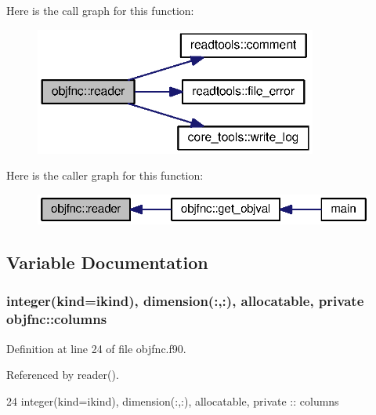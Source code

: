 Here is the call graph for this function\+:\nopagebreak
\begin{figure}[H]
\begin{center}
\leavevmode
\includegraphics[width=263pt]{namespaceobjfnc_ac0a20b2f9874813942bd7dc35e3b4842_cgraph}
\end{center}
\end{figure}




Here is the caller graph for this function\+:\nopagebreak
\begin{figure}[H]
\begin{center}
\leavevmode
\includegraphics[width=323pt]{namespaceobjfnc_ac0a20b2f9874813942bd7dc35e3b4842_icgraph}
\end{center}
\end{figure}




\subsection{Variable Documentation}
\subsubsection[{columns}]{\setlength{\rightskip}{0pt plus 5cm}integer(kind=ikind), dimension(\+:,\+:), allocatable, private objfnc\+::columns\hspace{0.3cm}{\ttfamily [private]}}\label{namespaceobjfnc_adb2a7345e2fae82f69a013ae851a0681}


Definition at line 24 of file objfnc.\+f90.



Referenced by reader().


\begin{DoxyCode}
24   \textcolor{keywordtype}{integer(kind=ikind)}, \textcolor{keywordtype}{dimension(:,:)}, \textcolor{keywordtype}{allocatable}, \textcolor{keywordtype}{private} :: columns
\end{DoxyCode}
